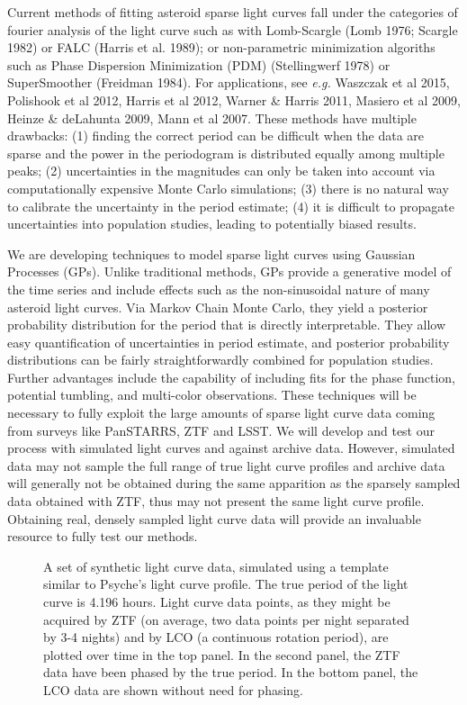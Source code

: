 \documentclass[11pt]{article}
\begin{document}
Current methods of fitting asteroid sparse light curves fall under the categories of
fourier analysis of the light curve such as with Lomb-Scargle (Lomb 1976; Scargle 1982) or FALC (Harris et al. 1989); or non-parametric
minimization algoriths such as Phase Dispersion Minimization (PDM) (Stellingwerf 1978) or SuperSmoother (Freidman 1984).
For applications, see {\it e.g.} Waszczak et al  2015, Polishook et al 2012, Harris et al  2012, Warner \& Harris 2011,
Masiero et al 2009, Heinze \& deLahunta 2009, Mann et al 2007.   These methods have multiple drawbacks:
(1) finding the correct period can be difficult when the data are sparse and the power in the periodogram is distributed equally among multiple peaks;
(2) uncertainties in the magnitudes can only be taken into account via computationally expensive Monte Carlo simulations;
(3) there is no natural way to calibrate the uncertainty in the period estimate;
(4) it is difficult to propagate uncertainties into population studies, leading to potentially biased results.

We are developing techniques to model sparse light curves using Gaussian Processes (GPs). 
Unlike traditional methods, GPs provide a generative model of the time series and include effects 
such as the non-sinusoidal nature of many asteroid light curves. Via Markov Chain Monte Carlo, 
they yield a posterior probability distribution for the period that is directly interpretable. 
They allow easy quantification of uncertainties in period estimate, and posterior probability distributions 
can be fairly straightforwardly combined for population studies. Further advantages
include the capability of including fits for the phase function, potential tumbling, 
and multi-color observations. These techniques will be necessary to fully
exploit the large amounts of sparse light curve data coming from surveys like
PanSTARRS, ZTF and LSST. We will develop and test our process with simulated light curves and against 
archive data. However, simulated data may not sample the full range
of true light curve profiles and archive data will generally not be obtained
during the same apparition as the sparsely sampled data obtained with ZTF, thus may
not present the same light curve profile. Obtaining real, densely sampled
light curve data will provide an invaluable resource to fully test our methods.

\begin{figure}[hbt]
\caption{A set of synthetic light curve data, simulated using a template similar to Psyche's light curve profile. The true period of the light curve is 4.196 hours. Light curve data points, as they might be acquired by ZTF (on average, two data points per night separated by 3-4 nights) and by LCO (a continuous rotation period), are plotted over time in the top panel. In the second panel, the ZTF data have been phased by the true period. In the bottom panel, the LCO data are shown without need for phasing.}
\end{figure}
\end{document}
